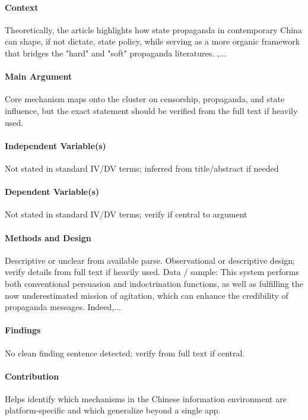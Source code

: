 \documentclass[12pt]{article}
\begin{document}
\paragraph{Context} Theoretically, the article highlights how state propaganda in contemporary China can shape, if not dictate, state policy, while serving as a more organic framework that bridges the "hard" and "soft" propaganda literatures.  ,...

\paragraph{Main Argument} Core mechanism maps onto the cluster on censorship, propaganda, and state influence, but the exact statement should be verified from the full text if heavily used.

\paragraph{Independent Variable(s)} Not stated in standard IV/DV terms; inferred from title/abstract if needed

\paragraph{Dependent Variable(s)} Not stated in standard IV/DV terms; verify if central to argument

\paragraph{Methods and Design} Descriptive or unclear from available parse. Observational or descriptive design; verify details from full text if heavily used. Data / sample: This system performs both conventional persuasion and indoctrination functions, as well as fulfilling the now underestimated mission of agitation, which can enhance the credibility of propaganda messages. Indeed,...

\paragraph{Findings} No clean finding sentence detected; verify from full text if central.

\paragraph{Contribution} Helps identify which mechanisms in the Chinese information environment are platform-specific and which generalize beyond a single app.
\end{document}
